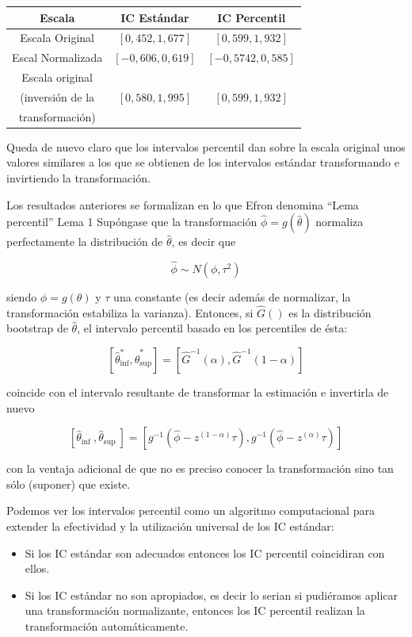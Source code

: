 \documentclass[
]{article}
\providecommand{\tightlist}{%
  \setlength{\itemsep}{0pt}\setlength{\parskip}{0pt}}
\begin{document}
\begin{longtable}[]{@{}ccc@{}}
\toprule\noalign{}
Escala & IC Estándar & IC Percentil \\
\midrule\noalign{}
\endhead
\bottomrule\noalign{}
\endlastfoot
Escala Original & \([0,452,1,677]\) & \([0,599,1,932]\) \\
Escal Normalizada & \([-0,606,0,619]\) & \([-0,5742,0,585]\) \\
Escala original & & \\
(inversión de la & \([0,580,1,995]\) & \([0,599,1,932]\) \\
transformación) & & \\
\end{longtable}

Queda de nuevo claro que los intervalos percentil dan sobre la escala original unos valores similares a los que se obtienen de los intervalos estándar transformando e invirtiendo la transformación.

Los resultados anteriores se formalizan en lo que Efron denomina ``Lema percentil''
Lema 1 Supóngase que la transformación \(\hat{\phi}=g(\hat{\theta})\) normaliza perfectamente la distribución de \(\hat{\theta}\), es decir que

\[
\hat{\phi} \sim N\left(\phi, \tau^{2}\right)
\]

siendo \(\phi=g(\theta)\) y \(\tau\) una constante (es decir además de normalizar, la transformación estabiliza la varianza). Entonces, si \(\hat{G}()\) es la distribución bootstrap de \(\hat{\theta}\), el intervalo percentil basado en los percentiles de ésta:

\[
\left[\hat{\theta}_{\mathrm{inf}}^{*}, \hat{\theta}_{\mathrm{sup}}^{*}\right]=\left[\hat{G}^{-1}(\alpha), \hat{G}^{-1}(1-\alpha)\right]
\]

coincide con el intervalo resultante de transformar la estimación e invertirla de nuevo

\[
\left[\hat{\theta}_{\text {inf }}, \hat{\theta}_{\text {sup }}\right]=\left[g^{-1}\left(\hat{\phi}-z^{(1-\alpha)} \tau\right), g^{-1}\left(\hat{\phi}-z^{(\alpha)} \tau\right)\right]
\]

con la ventaja adicional de que no es preciso conocer la transformación sino tan sólo (suponer) que existe.

Podemos ver los intervalos percentil como un algoritmo computacional para extender la efectividad y la utilización universal de los IC estándar:

\begin{itemize}
\tightlist
\item
  Si los IC estándar son adecuados entonces los IC percentil coincidiran con ellos.
\item
  Si los IC estándar no son apropiados, es decir lo serian si pudiéramos aplicar una transformación normalizante, entonces los IC percentil realizan la transformación automáticamente.
\end{itemize}
\end{document}
